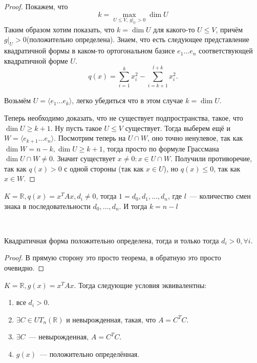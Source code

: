 \begin{proof}
	Покажем, что 
	\[
			k = \max_{U\le V, \ g|_U > 0} \dim U
	\] Таким образом хотим показать, что $k = \dim U$ для какого-то  $U\le V$, причём $g|_U > 0$(положительно определена).
    Знаем, что есть следующее представление квадратичной формы в каком-то ортогональном базисе $e_1\dots e_n$ 
    соответствующей квадратичной форме $U$.
     \[
         q(x) = \sum\limits_{i=1}^{k}{x_i^2} - \sum\limits_{i = k + 1}^{l + k}{x^2_i}
    .\] 

    Возьмём $U = \langle e_1\dots e_k\rangle$, легко убедиться что в этом случае $k = \dim U$.

    Теперь необходимо доказать, что не существует подпространства, такое, что $\dim U \ge k + 1$. 
    Ну пусть такое $U \le V$ существует. Тогда выберем ещё и $W = \langle e_{k + 1} \dots e_n\rangle$.
    Посмотрим теперь на  $U \cap W$, оно точно ненулевое, так как $\dim W = n - k, \dim U \ge k + 1$,
    тогда просто по формуле Грассмана $\dim U \cap W \not= 0$.%
    Значит существует  $x \not= 0\colon x\in U\cap W$. Получили противоречие, так как $q(x) > 0$ с одной стороны
    (так как $x\in U$), но $q(x) \le 0$, так как $x\in W$.
\end{proof}
\begin{follow}
    $K = \mathbb{R}, q(x) = x^T A x, d_i \not= 0$, тогда  $1 = d_0,d_1,\dots, d_n$, где $l$~--- количество смен знака в
    последовательности $d_0,\dots,d_n$. И тогда $k = n - l$
\end{follow}
\\\quad
\begin{follow}
    Квадратичная форма положительно определена, тогда и только тогда $d_i > 0, \forall i$.
\end{follow}
\begin{proof}
    В прямую сторону это просто теорема, в обратную это просто очевидно.
\end{proof}
 \begin{theorem}
     $K = \mathbb{R}, g(x) = x^TAx.$ 
     Тогда следующие условия эквивалентны:
     \begin{enumerate}
         \item все $d_i > 0$.
         \item $\exists C \in UT_n(\mathbb{R})$ и невырожденная, такая, что $A = C^T C$.
         \item  $\exists C$~--- невырожденная, $A = C^T C$.
         \item  $g(x)$~--- положительно определённая.
     \end{enumerate}
\end{theorem}
